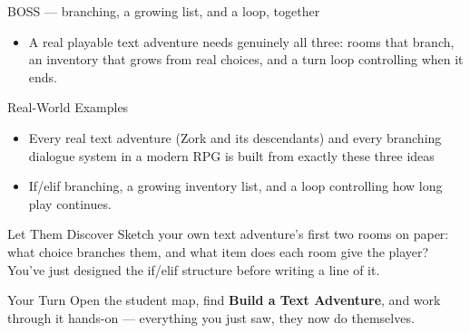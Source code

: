 \documentclass[aspectratio=169]{beamer}
\begin{document}
\begin{frame}{BOSS — branching, a growing list, and a loop, together}
    \large
    \begin{itemize}
        \item A real playable text adventure needs genuinely all three: rooms that branch, an inventory that grows from real choices, and a turn loop controlling when it ends.
    \end{itemize}
\end{frame}

\begin{frame}{Real-World Examples}
    \large
    \begin{itemize}
        \item Every real text adventure (Zork and its descendants) and every branching dialogue system in a modern RPG is built from exactly these three ideas
        \item If/elif branching, a growing inventory list, and a loop controlling how long play continues.
    \end{itemize}
\end{frame}


\begin{frame}{Let Them Discover}
    \Large
    Sketch your own text adventure's first two rooms on paper: what choice branches them, and what item does each room give the player? You've just designed the if/elif structure before writing a line of it.
\end{frame}

\begin{frame}{Your Turn}
    \Large
    Open the student map, find \textbf{Build a Text Adventure}, and work through it
    hands-on --- everything you just saw, they now do themselves.
\end{frame}
\end{document}

